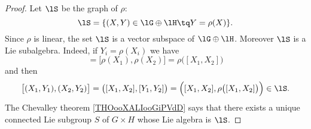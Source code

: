 \begin{proof}
    Let \( \lS\) be the graph of \( \rho\):
    \begin{equation}
        \lS=\{ (X,Y)\in \lG\oplus\lH\tq Y=\rho(X) \}.
    \end{equation}
    Since \( \rho\) is linear, the set \( \lS\) is a vector subspace of \( \lG \oplus\lH\). Moreover \( \lS\) is a Lie subalgebra. Indeed, if \( Y_i=\rho(X_i)\) we have
    \begin{equation}
        [Y_1,Y_2]=\big[ \rho(X_1),\rho(X_2) \big]=\rho\big( [X_1,X_2] \big)
    \end{equation}
    and then
    \begin{equation}
        \big[ (X_1,Y_1),(X_2,Y_2) \big]=\big( [X_1,X_2],[Y_1,Y_2] \big)=\Big( [X_1,X_2],\rho\big( [X_1,X_2] \big) \Big)\in\lS.
    \end{equation}
    The Chevalley theorem \ref{THOooXALIooGiPVdD} says that there exists a unique connected Lie subgroup \( S\) of \( G\times H\) whose Lie algebra is \( \lS\).


\end{proof}
